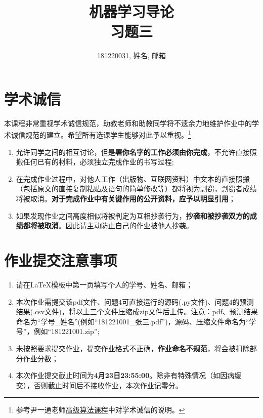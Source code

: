 \documentclass[a4paper,UTF8]{article}
\theoremstyle{definition}
\begin{document}
\title{机器学习导论\\习题三}
\author{181220031, 姓名, 邮箱}
\maketitle


\section*{学术诚信}

本课程非常重视学术诚信规范，助教老师和助教同学将不遗余力地维护作业中的学术诚信规范的建立。希望所有选课学生能够对此予以重视。\footnote{参考尹一通老师\href{http://tcs.nju.edu.cn/wiki/}{高级算法课程}中对学术诚信的说明。}

\begin{tcolorbox}
	\begin{enumerate}
		\item[(1)] 允许同学之间的相互讨论，但是{\color{red}\textbf{署你名字的工作必须由你完成}}，不允许直接照搬任何已有的材料，必须独立完成作业的书写过程;
		\item[(2)] 在完成作业过程中，对他人工作（出版物、互联网资料）中文本的直接照搬（包括原文的直接复制粘贴及语句的简单修改等）都将视为剽窃，剽窃者成绩将被取消。{\color{red}\textbf{对于完成作业中有关键作用的公开资料，应予以明显引用}}；
		\item[(3)] 如果发现作业之间高度相似将被判定为互相抄袭行为，{\color{red}\textbf{抄袭和被抄袭双方的成绩都将被取消}}。因此请主动防止自己的作业被他人抄袭。
	\end{enumerate}
\end{tcolorbox}

\section*{作业提交注意事项}
\begin{tcolorbox}
	\begin{enumerate}
		\item[(1)] 请在LaTeX模板中第一页填写个人的学号、姓名、邮箱；
		\item[(2)] 本次作业需提交该pdf文件、问题4可直接运行的源码(.py文件)、问题4的预测结果(.csv文件)，将以上三个文件压缩成zip文件后上传。注意：pdf、预测结果命名为“学号\_姓名”(例如“181221001\_张三.pdf”)，源码、压缩文件命名为“学号”，例如“181221001.zip”;
		\item[(3)] 未按照要求提交作业，提交作业格式不正确，{\color{red}\textbf{作业命名不规范}}，将会被扣除部分作业分数；
		\item[(4)] 本次作业提交截止时间为{\color{red}\textbf{4月23日23:55:00}}。除非有特殊情况（如因病缓交），否则截止时间后不接收作业，本次作业记零分。
	\end{enumerate}
\end{tcolorbox}
\end{document}
